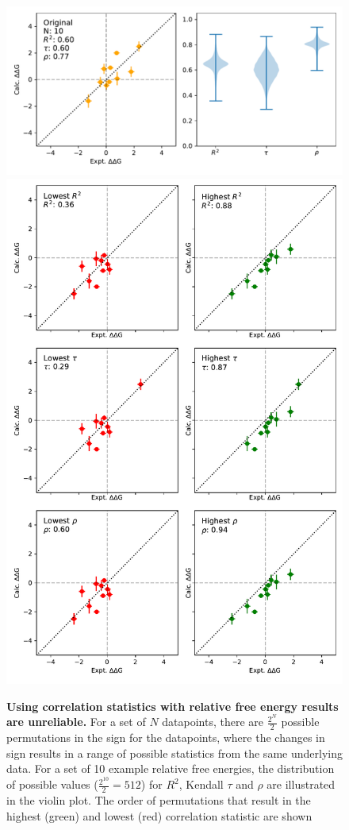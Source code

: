 \documentclass[9pt,bestpractices]{livecoms}
\begin{document}
\begin{figure}
    \includegraphics[width=0.95\linewidth]{figures/reporting/relativeissuesA.pdf}
    \includegraphics[width=0.95\linewidth]{figures/reporting/relativeissuesB.pdf}
    \caption{\textbf{Using correlation statistics with relative free energy results are unreliable.} For a set of $N$ datapoints, there are $\frac{2^N}{2}$ possible permutations in the sign for the datapoints, where the changes in sign results in a range of possible statistics from the same underlying data. For a set of 10 example relative free energies, the distribution of possible values ($\frac{2^{10}}{2} = 512$) for $R^2$, Kendall $\tau$ and $\rho$ are illustrated in the violin plot. The order of permutations that result in the highest (green) and lowest (red) correlation statistic are shown 
}
\end{figure}
\end{document}
